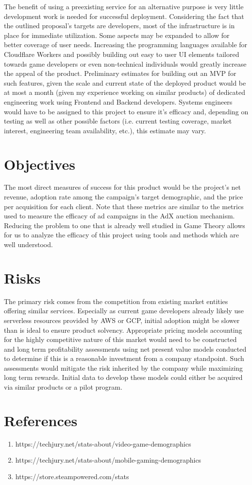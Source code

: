 \documentclass[a4paper, 11pt]{article}
\begin{document}
The benefit of using a preexisting service for an alternative purpose is very little development work is needed for successful deployment. Considering the fact that the outlined proposal's targets are developers, most of the infrastructure is in place for immediate utilization. Some aspects may be expanded to allow for better coverage of user needs. Increasing the programming languages available for Cloudflare Workers and possibly building out easy to user UI elements tailored towards game developers or even non-technical individuals would greatly increase the appeal of the product. Preliminary estimates for building out an MVP for such features, given the scale and current state of the deployed product would be at most a month (given my experience working on similar products) of dedicated engineering work using Frontend and Backend developers. Systems engineers would have to be assigned to this project to ensure it's efficacy and, depending on testing as well as other possible factors (i.e. current testing coverage, market interest, engineering team availability, etc.), this estimate may vary. 

\section{Objectives}

The most direct measures of success for this product would be the project's net revenue, adoption rate among the campaign's target demographic, and the price per acquisition for each client. Note that these metrics are similar to the metrics used to measure the efficacy of ad campaigns in the AdX auction mechanism. Reducing the problem to one that is already well studied in Game Theory allows for us to analyze the efficacy of this project using tools and methods which are well understood. 

\section{Risks}
The primary risk comes from the competition from existing market entities offering similar services. Especially as current game developers already likely use serverless resources provided by AWS or GCP, initial adoption might be slower than is ideal to ensure product solvency. Appropriate pricing models accounting for the highly competitive nature of this market would need to be constructed and long term profitability assessments using net present value models conducted to determine if this is a reasonable investment from a company standpoint. Such assessments would mitigate the risk inherited by the company while maximizing long term rewards. Initial data to develop these models could either be acquired via similar products or a pilot program.

\section{References}
\begin{enumerate}[1.]
\item 
https://techjury.net/stats-about/video-game-demographics

\item
https://techjury.net/stats-about/mobile-gaming-demographics

\item
https://store.steampowered.com/stats


\end{enumerate}
\end{document}
